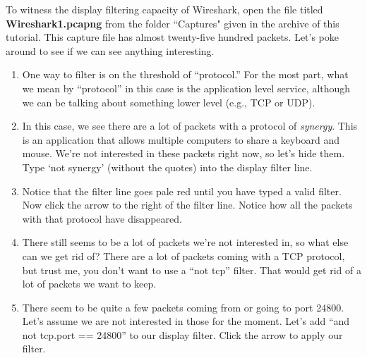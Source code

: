 \documentclass[12pt]{extarticle}
\newcommand{\ben}{\begin{enumerate}}
\newcommand{\een}{\end{enumerate}}
\begin{document}
\vspace{4mm}
\noindent
To witness the display filtering capacity of Wireshark, open the file titled \textbf{Wireshark1.pcapng} from the folder ``Captures" given in the archive of this tutorial. This capture file has almost twenty-five hundred packets.  Let's poke around to see if we can see anything interesting.

\ben[i]

\item One way to filter is on the threshold of ``protocol.''  For the most part, what we mean by ``protocol'' in this case is the application level service, although we can be talking about something lower level (e.g., TCP or UDP).  

\item In this case, we see there are a lot of packets with a protocol of \textit{synergy}.  This is an application that allows multiple computers to share a keyboard and mouse.  We're not interested in these packets right now, so let's hide them.  Type `not synergy' (without the quotes) into the display filter line.  

\item Notice that the filter line goes pale red until you have typed a valid filter.  Now click the arrow to the right of the filter line.  Notice how all the packets with that protocol have disappeared.

\item There still seems to be a lot of packets we're not interested in, so what else can we get rid of?  There are a lot of packets coming with a TCP protocol, but trust me, you don't want to use a ``not tcp'' filter. That would get rid of a lot of packets we want to keep.   

\item There seem to be quite a few packets coming from or going to port 24800.  Let's assume we are not interested in those for the moment.  Let's add ``and not tcp.port == 24800'' to our display filter.  Click the arrow to apply our filter.

\een

\end{document}
